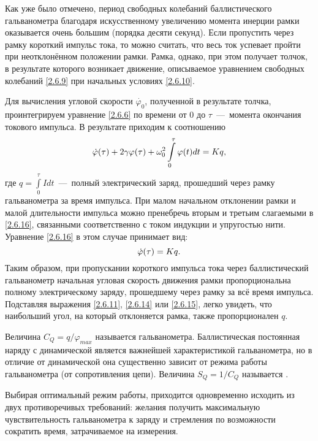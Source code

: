 Как уже было отмечено, период свободных
колебаний баллистического гальванометра благодаря искусственному
увеличению момента инерции рамки оказывается очень большим (порядка
десяти секунд). Если пропустить через рамку короткий импульс тока, то
можно считать, что весь ток успевает пройти при неотклонённом положении
рамки. Рамка, однако, при этом получает толчок, в результате которого
возникает движение, описываемое уравнением свободных колебаний \eqref{2.6.9} при
начальных условиях \eqref{2.6.10}.

Для вычисления угловой скорости $\dot{\varphi_0}$, полученной в результате толчка,
проинтегрируем уравнение \eqref{2.6.6} по времени от $0$ до $\tau$~---~момента 
окончания токового импульса. В результате приходим к соотношению
\begin{equation}
	\eqmark{2.6.17}
	 \dot\varphi(\tau) + 2\gamma\varphi(\tau) + 
     \omega_0^2 \int\limits_0^\tau \varphi(t) dt = 
     Kq,
\end{equation}
где $q = \int\limits_0^\tau I dt$~---~полный электрический заряд, прошедший 
через рамку гальванометра за
время импульса. При малом начальном отклонении рамки и малой
длительности импульса можно пренебречь вторым и третьим слагаемыми в
\eqref{2.6.16}, связанными соответственно с током индукции и упругостью нити.
Уравнение \eqref{2.6.16} в этом случае принимает вид:
\begin{equation}
	\eqmark{2.6.18}
	 \dot\varphi(\tau) = Kq.
\end{equation}
Таким образом, при пропускании короткого импульса тока через
баллистический гальванометр начальная угловая скорость движения рамки
пропорциональна полному электрическому заряду, прошедшему через рамку за
всё время импульса. Подставляя выражения \eqref{2.6.11}, \eqref{2.6.14} или \eqref{2.6.15}, легко
увидеть, что наибольший угол, на который отклоняется рамка, также
пропорционален $q$.

Величина $C_Q = q/\varphi_{max}$ называется  
гальванометра. Баллистическая постоянная наряду с динамической является важнейшей
характеристикой гальванометра, но в отличие от динамической она
существенно зависит от режима работы гальванометра (от сопротивления
цепи). Величина $S_Q = 1/C_Q$ называется .

Выбирая оптимальный режим работы, приходится одновременно исходить из
двух противоречивых требований: желания получить максимальную
чувствительность гальванометра к заряду и стремления по возможности
сократить время, затрачиваемое на измерения.

